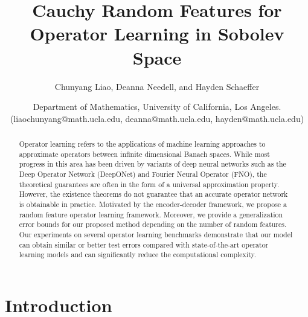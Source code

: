 \documentclass[11pt,twoside]{article}
\title{Cauchy Random Features for Operator Learning in Sobolev Space}
\author{Chunyang Liao, Deanna Needell, and Hayden Schaeffer}
\date{Department of Mathematics, \quad University of California, Los Angeles. \\ (liaochunyang@math.ucla.edu, deanna@math.ucla.edu, hayden@math.ucla.edu)}
\theoremstyle{plain}
\theoremstyle{definition}
\theoremstyle{remark}
\begin{document}
\maketitle

\begin{abstract}
Operator learning refers to the applications of machine learning approaches to approximate operators between infinite dimensional Banach spaces.
While most progress in this area has been driven by variants of deep neural networks such as the Deep Operator Network (DeepONet) and Fourier Neural Operator (FNO), the theoretical guarantees are often in the form of a universal approximation property. 
However, the existence theorems do not guarantee that an accurate operator network is obtainable in practice. 
Motivated by the encoder-decoder framework, we propose a random feature operator learning framework.
Moreover, we provide a generalization error bounds for our proposed method depending on the number of random features.
Our experiments on several operator learning benchmarks demonstrate that our model can obtain similar or better test errors compared with state-of-the-art operator learning models and can significantly reduce the computational complexity.
\end{abstract}

\section{Introduction}
\end{document}
